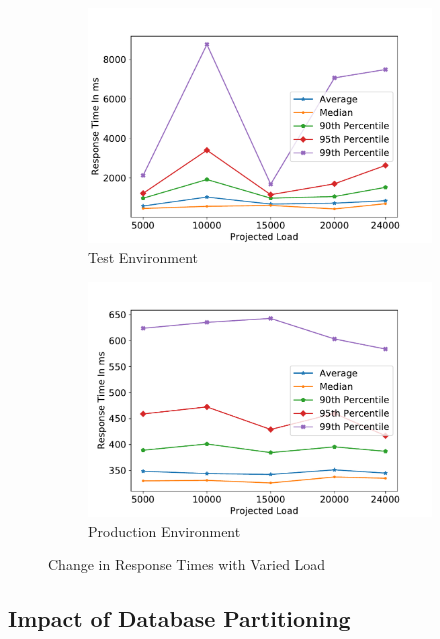 \documentclass[sigconf,authordraft]{acmart}
\begin{document}
\begin{figure}
	\centering
	\begin{subfigure}{0.5\linewidth}
		\includegraphics[width=\linewidth]{Test_Bed_Varied_Load}
		\caption{Test Environment}
		\label{fig:varied_load_tes}
	\end{subfigure}
	\begin{subfigure}{0.49\linewidth}
		\includegraphics[width=\linewidth]{Production_Varied_Load}
		\caption{Production Environment}
		\label{fig:varied_load_final}
	\end{subfigure}
\caption{Change in Response Times with Varied Load}
\label{fig:varied_load}
\end{figure}

\subsection{Impact of Database Partitioning}
\end{document}
